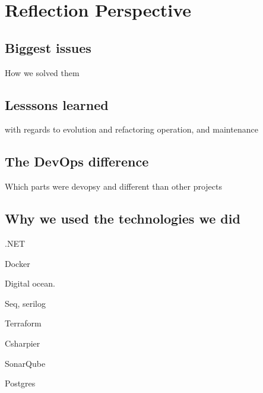 \section{Reflection Perspective}

\subsection{Biggest issues}

How we solved them

\subsection{Lesssons learned}

with regards to
evolution and refactoring
operation, and
maintenance

\subsection{The DevOps difference}

Which parts were devopsy and different than other projects

\subsection{Why we used the technologies we did}

.NET

Docker

Digital ocean.

Seq, serilog

Terraform

Csharpier

SonarQube

Postgres